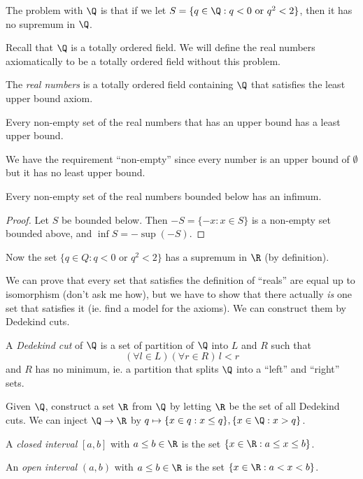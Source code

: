 \documentclass[a4paper]{article}
\begin{document}
The problem with $\Q$ is that if we let $S = \{q\in \Q: q < 0 \text{ or } q^2 < 2\}$, then it has no supremum in $\Q$.

Recall that $\Q$ is a totally ordered field. We will define the real numbers axiomatically to be a totally ordered field without this problem.
\begin{defi}
  The \emph{real numbers} is a totally ordered field containing $\Q$ that satisfies the least upper bound axiom.
\end{defi}

\begin{axiom}
  Every non-empty set of the real numbers that has an upper bound has a least upper bound.
\end{axiom}

We have the requirement ``non-empty'' since every number is an upper bound of $\emptyset$ but it has no least upper bound.

\begin{cor}
  Every non-empty set of the real numbers bounded below has an infimum.
\end{cor}
\begin{proof}
  Let $S$ be bounded below. Then $-S = \{-x: x\in S\}$  is a non-empty set bounded above, and $\inf S = -\sup (-S)$.
\end{proof}
Now the set $\{q\in Q: q < 0 \text{ or } q^2 < 2\}$ has a supremum in $\R$ (by definition).

We can prove that every set that satisfies the definition of ``reals'' are equal up to isomorphism (don't ask me how), but we have to show that there actually \emph{is} one set that satisfies it (ie. find a model for the axioms). We can construct them by Dedekind cuts.

\begin{defi}
  A \emph{Dedekind cut} of $\Q$ is a set of partition of $\Q$ into $L$ and $R$ such that
  \[
    (\forall l\in L)(\forall r\in R)\,l < r
  \]
  and $R$ has no minimum, ie. a partition that splits $\Q$ into a ``left'' and ``right'' sets.
\end{defi}

Given $\Q$, construct a set $\R$ from $\Q$ by letting $\R$ be the set of all Dedekind cuts. We can inject $\Q\to \R$ by $q\mapsto \{x\in q: x \leq q\}, \{x\in \Q: x> q\}$.

\begin{defi}
  A \emph{closed interval} $[a, b]$ with $a \leq b\in \R$ is the set $\{x\in \R: a\leq x\leq b\}$.

  An \emph{open interval} $(a, b)$ with $a \leq b\in \R$ is the set $\{x\in \R: a< x< b\}$.
\end{defi}
\end{document}

